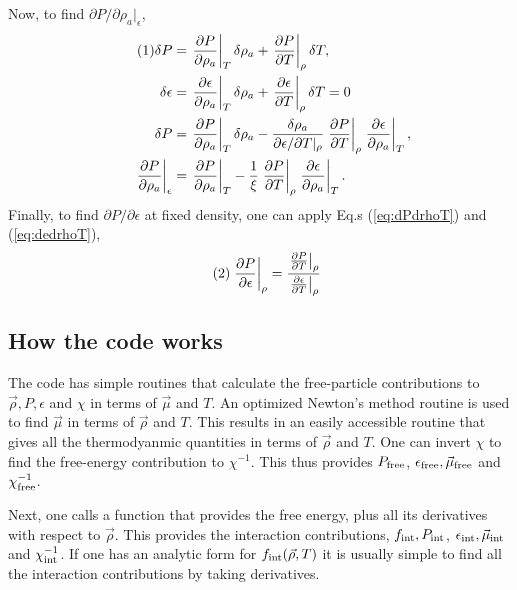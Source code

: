 \documentclass[12pt]{article}
\numberwithin{equation}{section}
\numberwithin{figure}{section}
\newcommand\eqnumber{\addtocounter{equation}{1}\tag{\theequation}}
\begin{document}
Now, to find $\partial P/\partial \rho_a|_\epsilon$, 
\begin{align*}\eqnumber
\delta P&=\left.\frac{\partial P}{\partial\rho_a}\right|_T\delta\rho_a+\left.\frac{\partial P}{\partial T}\right|_\rho\delta T,\\
\delta \epsilon&=\left.\frac{\partial \epsilon}{\partial\rho_a}\right|_T\delta\rho_a+\left.\frac{\partial \epsilon}{\partial T}\right|_\rho\delta T=0\\
\delta P&=\left.\frac{\partial P}{\partial\rho_a}\right|_T\delta\rho_a-\frac{\delta\rho_a}{\partial\epsilon/\partial T|_\rho}
\left.\frac{\partial P}{\partial T}\right|_\rho\left.\frac{\partial\epsilon}{\partial\rho_a}\right|_T,\\
\left.\frac{\partial P}{\partial\rho_a}\right|_\epsilon&=\left.\frac{\partial P}{\partial \rho_a}\right|_T
-\frac{1}{\xi}\left.\frac{\partial P}{\partial T}\right|_\rho\left.\frac{\partial\epsilon}{\partial\rho_a}\right|_T.
\end{align*}
Finally, to find $\partial P/\partial\epsilon$ at fixed density, one can apply Eq.s (\ref{eq:dPdrhoT}) and (\ref{eq:dedrhoT}),
\begin{align*}\eqnumber
\left.\frac{\partial P}{\partial\epsilon}\right|_\rho&=\frac{\left.\frac{\partial P}{\partial T}\right|_\rho}
{\left.\frac{\partial\epsilon}{\partial T}\right|_\rho}
\end{align*}

\subsection{How the code works}

The code has simple routines that calculate the free-particle contributions to $\vec{\rho},P,\epsilon$ and $\chi$ in terms of $\vec{\mu}$ and $T$. An optimized Newton's method routine is used to find $\vec{\mu}$ in terms of $\vec{\rho}$ and $T$. This results in an easily accessible routine that gives all the thermodyanmic quantities in terms of $\vec{\rho}$ and $T$. One can invert $\chi$ to find the free-energy contribution to $\chi^{-1}$. This thus provides $P_{\rm free}$, $\epsilon_{\rm free}, \vec{\mu}_{\rm free}$ and $\chi^{-1}_{\rm free}$.

Next, one calls a function that provides the free energy, plus all its derivatives with respect to $\vec{\rho}$. This provides the interaction contributions, $f_{\rm int}, P_{\rm int}$, $\epsilon_{\rm int}, \vec{\mu}_{\rm int}$ and $\chi^{-1}_{\rm int}$. If one has an analytic form for $f_{\rm int}(\vec{\rho},T)$ it is usually simple to find all the interaction contributions by taking derivatives.
\end{document}
